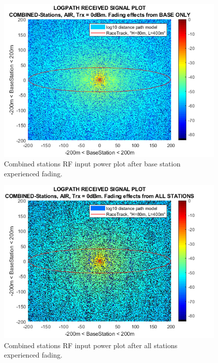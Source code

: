 \begin{figure}[h]
	\centering
	\includegraphics[width=\linewidth]{theory/fading/fig/logpathReceivedSignal_combinedStations_baseOnly.png}
	\caption{Combined stations RF input power plot after base station experienced fading.}
	\label{fig:logpathReceivedSignal_combinedStations_baseOnly}
\end{figure}

\begin{figure}[h]
\centering
\includegraphics[width=\linewidth]{theory/fading/fig/logpathReceivedSignal_combinedStations_allStations.png}
\caption{Combined stations RF input power plot after all stations experienced fading.}
\label{fig:logpathReceivedSignal_combinedStations_allStations}
\end{figure}

